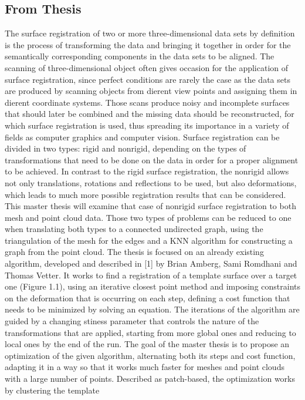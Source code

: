 \documentclass[../structure.tex]{subfiles}
\begin{document}
	\subsection{From Thesis}
	The surface registration of two or more three-dimensional data sets by definition
is the process of transforming the data and bringing it together in
order for the semantically corresponding components in the data sets to be
aligned. The scanning of three-dimensional object often gives occasion for the application of surface registration, since perfect conditions are rarely the case as the data sets are produced by scanning objects from dierent view
points and assigning them in dierent coordinate systems. Those scans produce
noisy and incomplete surfaces that should later be combined and the
missing data should be reconstructed, for which surface registration is used,
thus spreading its importance in a variety of fields as computer graphics and
computer vision.
Surface registration can be divided in two types: rigid and nonrigid, depending
on the types of transformations that need to be done on the data in
order for a proper alignment to be achieved. In contrast to the rigid surface
registration, the nonrigid allows not only translations, rotations and reflections
to be used, but also deformations, which leads to much more possible
registration results that can be considered.
This master thesis will examine that case of nonrigid surface registration
to both mesh and point cloud data. Those two types of problems can be
reduced to one when translating both types to a connected undirected graph,
using the triangulation of the mesh for the edges and a KNN algorithm for
constructing a graph from the point cloud. The thesis is focused on an already
existing algorithm, developed and described in [1] by Brian Amberg, Sami
Romdhani and Thomas Vetter. It works to find a registration of a template
surface over a target one (Figure 1.1), using an iterative closest point method
and imposing constraints on the deformation that is occurring on each step,
defining a cost function that needs to be minimized by solving an equation.
The iterations of the algorithm are guided by a changing stiness parameter
that controls the nature of the transformations that are applied, starting
from more global ones and reducing to local ones by the end of the run. The
goal of the master thesis is to propose an optimization of the given algorithm,
alternating both its steps and cost function, adapting it in a way so that it
works much faster for meshes and point clouds with a large number of points.
Described as patch-based, the optimization works by clustering the template
\end{document}
